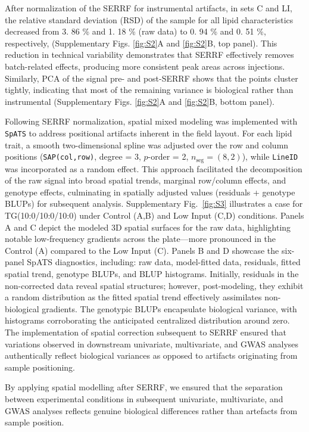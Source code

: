 \documentclass[10pt,letterpaper]{article}
\begin{document}
After normalization of the SERRF for instrumental artifacts, in sets C and LI, the relative standard deviation (RSD) of the sample  for all lipid characteristics decreased from 3. 86 \% and 1. 18 \% (raw data)  to 0. 94 \% and 0. 51 \%, respectively,  (Supplementary Figs. \ref{fig:S2}A and \ref{fig:S2}B, top panel). This reduction in technical variability demonstrates that SERRF effectively removes batch-related effects, producing more consistent peak areas across injections. Similarly, PCA of the signal pre- and post-SERRF shows that the points cluster tightly, indicating that most of the remaining variance is biological rather than instrumental (Supplementary Figs. \ref{fig:S2}A and \ref{fig:S2}B, bottom panel).

Following SERRF normalization, spatial mixed modeling was implemented with \texttt{SpATS} to address positional artifacts inherent in the field layout. For each lipid trait, a smooth two-dimensional spline was adjusted over the row and column positions (\texttt{SAP(col,row)}, degree = 3, $p$-order = 2, $n_{\mathrm{seg}}=(8,2)$), while \texttt{LineID} was incorporated as a random effect. This approach facilitated the decomposition of the raw signal into broad spatial trends, marginal row/column effects, and genotype effects, culminating in spatially adjusted values (residuals + genotype BLUPs) for subsequent analysis. Supplementary Fig.~\ref{fig:S3} illustrates a case for TG(10:0/10:0/10:0) under Control (A,B) and Low Input (C,D) conditions. Panels A and C depict the modeled 3D spatial surfaces for the raw data, highlighting notable low-frequency gradients across the plate—more pronounced in the Control (A) compared to the Low Input (C). Panels B and D showcase the six-panel SpATS diagnostics, including: raw data, model-fitted data, residuals, fitted spatial trend, genotype BLUPs, and BLUP histograms. Initially, residuals in the non-corrected data reveal spatial structures; however, post-modeling, they exhibit a random distribution as the fitted spatial trend effectively assimilates non-biological gradients. The genotypic BLUPs encapsulate biological variance, with histograms corroborating the anticipated centralized distribution around zero. The implementation of spatial correction subsequent to SERRF ensured that variations observed in downstream univariate, multivariate, and GWAS analyses authentically reflect biological variances as opposed to artifacts originating from sample positioning.

By applying spatial modelling after SERRF, we ensured that the separation between experimental conditions in subsequent univariate, multivariate, and GWAS analyses reflects genuine biological differences rather than artefacts from sample position.
\end{document}

